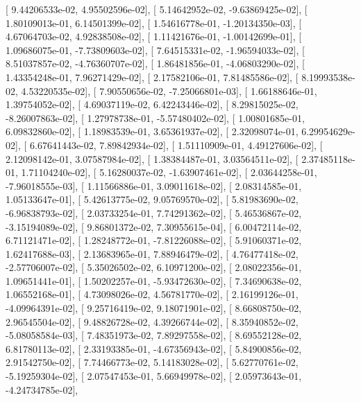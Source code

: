 \documentclass{article}
\begin{document}
       [  9.44206533e-02,   4.95502596e-02],
       [  5.14642952e-02,  -9.63869425e-02],
       [  1.80109013e-01,   6.14501399e-02],
       [  1.54616778e-01,  -1.20134350e-03],
       [  4.67064703e-02,   4.92838508e-02],
       [  1.11421676e-01,  -1.00142699e-01],
       [  1.09686075e-01,  -7.73809603e-02],
       [  7.64515331e-02,  -1.96594033e-02],
       [  8.51037857e-02,  -4.76360707e-02],
       [  1.86481856e-01,  -4.06803290e-02],
       [  1.43354248e-01,   7.96271429e-02],
       [  2.17582106e-01,   7.81485586e-02],
       [  8.19993538e-02,   4.53220535e-02],
       [  7.90550656e-02,  -7.25066801e-03],
       [  1.66188646e-01,   1.39754052e-02],
       [  4.69037119e-02,   6.42243446e-02],
       [  8.29815025e-02,  -8.26007863e-02],
       [  1.27978738e-01,  -5.57480402e-02],
       [  1.00801685e-01,   6.09832860e-02],
       [  1.18983539e-01,   3.65361937e-02],
       [  2.32098074e-01,   6.29954629e-02],
       [  6.67641443e-02,   7.89842934e-02],
       [  1.51110909e-01,   4.49127606e-02],
       [  2.12098142e-01,   3.07587984e-02],
       [  1.38384487e-01,   3.03564511e-02],
       [  2.37485118e-01,   1.71104240e-02],
       [  5.16280037e-02,  -1.63907461e-02],
       [  2.03644258e-01,  -7.96018555e-03],
       [  1.11566886e-01,   3.09011618e-02],
       [  2.08314585e-01,   1.05133647e-01],
       [  5.42613775e-02,   9.05769570e-02],
       [  5.81983690e-02,  -6.96838793e-02],
       [  2.03733254e-01,   7.74291362e-02],
       [  5.46536867e-02,  -3.15194089e-02],
       [  9.86801372e-02,   7.30955615e-04],
       [  6.00472114e-02,   6.71121471e-02],
       [  1.28248772e-01,  -7.81226088e-02],
       [  5.91060371e-02,   1.62417688e-03],
       [  2.13683965e-01,   7.88946479e-02],
       [  4.76477418e-02,  -2.57706007e-02],
       [  5.35026502e-02,   6.10971200e-02],
       [  2.08022356e-01,   1.09651441e-01],
       [  1.50202257e-01,  -5.93472630e-02],
       [  7.34690638e-02,   1.06552168e-01],
       [  4.73098026e-02,   4.56781770e-02],
       [  2.16199126e-01,  -4.09964391e-02],
       [  9.25716419e-02,   9.18071901e-02],
       [  8.66808750e-02,   2.96545504e-02],
       [  9.48826728e-02,   4.39266744e-02],
       [  8.35940852e-02,  -5.08058584e-03],
       [  7.48351973e-02,   7.89297558e-02],
       [  8.69552128e-02,   6.81780113e-02],
       [  2.33193385e-01,  -4.67356943e-02],
       [  5.84900856e-02,   2.91542750e-02],
       [  7.74466773e-02,   5.14183028e-02],
       [  5.62770761e-02,  -5.19259304e-02],
       [  2.07547453e-01,   5.66949978e-02],
       [  2.05973643e-01,  -4.24734785e-02],
\end{document}
